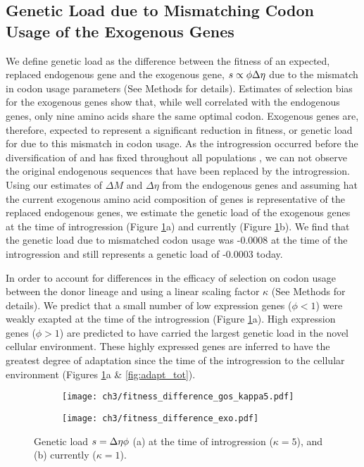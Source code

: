 \subsection{Genetic Load due to Mismatching Codon Usage of the Exogenous Genes}

We define genetic load as the difference between the fitness of an expected, replaced endogenous gene and the exogenous gene, $s \propto \phi {\Delta \eta}$ due to the mismatch in codon usage parameters (See Methods for details).
Estimates of selection bias for the exogenous genes show that, while well correlated with the endogenous genes, only nine amino acids share the same optimal codon.
Exogenous genes are, therefore, expected to represent a significant reduction in fitness, or genetic load for \kluyveri due to this mismatch in codon usage.
As the introgression occurred before the diversification of \kluyveri and has fixed throughout all populations \citep{friedrich2015}, we can not observe the original endogenous sequences that have been replaced by the introgression.
Using our estimates of $\Delta M$ and $\Delta \eta$ from the endogenous genes and assuming hat the current exogenous amino acid composition of genes is representative of the replaced endogenous genes, we estimate the genetic load of the exogenous genes at the time of introgression (Figure \ref{fig:sne_fitness_burden}a) and currently (Figure \ref{fig:sne_fitness_burden}b).
We find that the genetic load due to mismatched codon usage was -0.0008 at the time of the introgression and still represents a genetic load of -0.0003 today.

In order to account for differences in the efficacy of selection on codon usage between the donor lineage and \kluyveri using a linear scaling factor $\kappa$ (See Methods for details).
We predict that a small number of low expression genes ($\phi < 1$) were weakly exapted at the time of the introgression (Figure \ref{fig:sne_fitness_burden}a).
High expression genes ($\phi > 1$) are predicted to have carried the largest genetic load in the novel cellular environment.
These highly expressed genes are inferred to have the greatest degree of adaptation since the time of the introgression to the \kluyveri cellular environment (Figures \ref{fig:sne_fitness_burden}a \& \ref{fig:adapt_tot}).

\begin{figure}
    \centering
    \begin{subfigure}
        \centering
        \texttt{[image: ch3/fitness\_difference\_gos\_kappa5.pdf]}
    \end{subfigure}
    \begin{subfigure}
        \centering
        \texttt{[image: ch3/fitness\_difference\_exo.pdf]}
    \end{subfigure}
    \caption{Genetic load $s = {\Delta \eta} \phi$ (a) at the time of introgression ($\kappa = 5$), and (b) currently ($\kappa = 1$). }
    \label{fig:sne_fitness_burden}
\end{figure}


